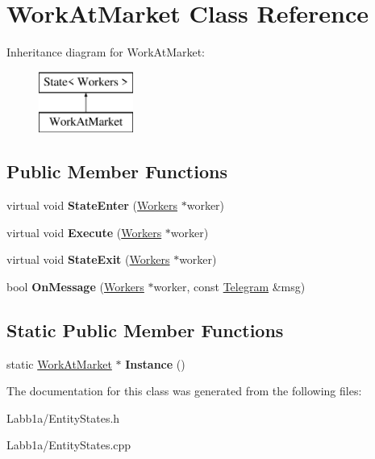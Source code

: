 \hypertarget{class_work_at_market}{}\section{Work\+At\+Market Class Reference}
\label{class_work_at_market}
Inheritance diagram for Work\+At\+Market\+:\begin{figure}[H]
\begin{center}
\leavevmode
\includegraphics[height=2.000000cm]{class_work_at_market}
\end{center}
\end{figure}
\subsection*{Public Member Functions}
\begin{DoxyCompactItemize}
\item 
\hypertarget{class_work_at_market_ada2ea7b0283b28379d45d98e35350abe}{}virtual void {\bfseries State\+Enter} (\hyperlink{class_workers}{Workers} $\ast$worker)\label{class_work_at_market_ada2ea7b0283b28379d45d98e35350abe}

\item 
\hypertarget{class_work_at_market_a39ef36aad1d1808a2ff86a40fd27a21d}{}virtual void {\bfseries Execute} (\hyperlink{class_workers}{Workers} $\ast$worker)\label{class_work_at_market_a39ef36aad1d1808a2ff86a40fd27a21d}

\item 
\hypertarget{class_work_at_market_a6ea79e0610c166f4c8bd5facccdf404e}{}virtual void {\bfseries State\+Exit} (\hyperlink{class_workers}{Workers} $\ast$worker)\label{class_work_at_market_a6ea79e0610c166f4c8bd5facccdf404e}

\item 
\hypertarget{class_work_at_market_ab63b3ad172773e7cbd1323c063760cac}{}bool {\bfseries On\+Message} (\hyperlink{class_workers}{Workers} $\ast$worker, const \hyperlink{struct_telegram}{Telegram} \&msg)\label{class_work_at_market_ab63b3ad172773e7cbd1323c063760cac}

\end{DoxyCompactItemize}
\subsection*{Static Public Member Functions}
\begin{DoxyCompactItemize}
\item 
\hypertarget{class_work_at_market_a29eee057b4337047c6792f1a0b7e06ab}{}static \hyperlink{class_work_at_market}{Work\+At\+Market} $\ast$ {\bfseries Instance} ()\label{class_work_at_market_a29eee057b4337047c6792f1a0b7e06ab}

\end{DoxyCompactItemize}


The documentation for this class was generated from the following files\+:\begin{DoxyCompactItemize}
\item 
Labb1a/Entity\+States.\+h\item 
Labb1a/Entity\+States.\+cpp\end{DoxyCompactItemize}
